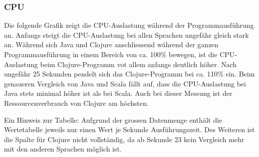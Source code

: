 \documentclass{fancydocument}
\begin{document}
\subsubsection{CPU}
Die folgende Grafik zeigt die CPU-Auslastung während der Programmausführung an. Anfangs steigt die CPU-Auslastung bei allen Sprachen ungefähr gleich stark an. Während sich Java und Clojure anschliessend während der ganzen Programmausführung in einem Bereich von ca. 100\% bewegen, ist die CPU-Auslastung beim Clojure-Programm vot allem anfangs deutlich höher. Nach ungefähr 25 Sekunden pendelt sich das Clojure-Programm bei ca. 110\% ein. Beim genaueren Vergleich von Java und Scala fällt auf, dass die CPU-Auslastung bei Java stets minimal höher ist als bei Scala. Auch bei dieser Messung ist der Ressourcenverbrauch von Clojure am höchsten.

\bigskip
\noindent
Ein Hinweis zur Tabelle: Aufgrund der grossen Datenmenge enthält die Wertetabelle jeweils nur einen Wert je Sekunde Ausführungszeit. Des Weiteren ist die Spalte für Clojure nicht vollständig, da ab Sekunde 23 kein Vergleich mehr mit den anderen Sprachen möglich ist.
\end{document}
